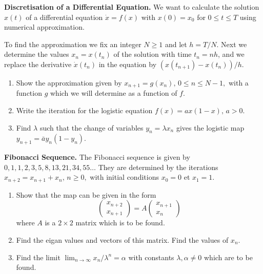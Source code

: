 \documentclass{article}
\begin{document}
\begin{question}
\textbf{Discretisation of a Differential Equation.} We want to calculate the solution $x(t)$ of a differential equation $\dot x = f(x)$ with $x(0)=x_0$ for $0\leqslant t \leqslant T$ using numerical approximation.

\medskip
\noindent
To find the approximation we fix an integer $N\geqslant 1$ and let $h= T/N$. Next we determine the values $x_n = x(t_n)$ of the solution with time $t_n = nh$, and we replace the derivative $\dot x(t_n)$ in the equation by $(x(t_{n+1})-x(t_n))/h$.
\begin{enumerate}[label=(\alph*)]
    \item  Show the approximation given by $x_{n+1} = g(x_n),\,0\leqslant n \leqslant N-1,$ with a function $g$ which we will determine as a function of $f$.
    \item Write the iteration for the logistic equation $f(x) = a x(1-x),\,a>0$.  
    \item Find $\lambda$ such that the change of variables $y_n = \lambda x_n$ gives the logistic map $y_{n+1} = \bar a y_n(1-y_n)$.
   \end{enumerate}
\end{question}


\begin{question} \textbf{Fibonacci Sequence.} The Fibonacci sequence is given by $0,1,1,2,3,5,8,13,21,34,55\dots$ They are determined by the iterations $x_{n+2} = x_{n+1}+x_n, \, n\geqslant 0,$ with initial conditions $x_{0}=0$ et $x_1=1$.

\begin{enumerate}[label=(\alph*)]
\item Show that the map can be given in the form
\begin{equation}
  \begin{pmatrix}
    x_{n+2}\\
    x_{n+1}
  \end{pmatrix}
  = A
  \begin{pmatrix}
    x_{n+1}\\
    x_{n}
  \end{pmatrix}
\end{equation}
  where $A$ is a $2\times 2$ matrix which is to be found.
  \item Find the eigan values and vectors of this matrix. Find the values of  $x_n$.
  \item Find the limit $ \lim_{n\to \infty} x_n/\lambda^n=\alpha$ with constants $\lambda,\alpha \neq 0$ which are to be found.

\end{enumerate}


\end{question}
\end{document}
